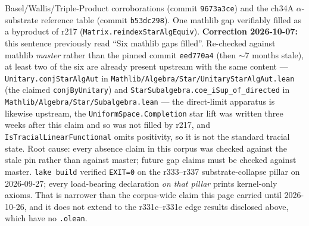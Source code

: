 \begin{titlepage}
{Basel/Wallis/Triple-Product corroborations (commit \texttt{9673a3ce}) and the ch34A $\alpha$-substrate reference table (commit \texttt{b53dc298}). One mathlib gap verifiably filled as a byproduct of r217 (\texttt{Matrix.reindexStarAlgEquiv}). \textbf{Correction 2026-10-07:} this sentence previously read ``Six mathlib gaps filled''. Re-checked against mathlib \emph{master} rather than the pinned commit \texttt{eed770a4} (then $\sim$7 months stale), at least two of the six are already present upstream with the same content --- \texttt{Unitary.conjStarAlgAut} in \texttt{Mathlib/Algebra/Star/UnitaryStarAlgAut.lean} (the claimed \texttt{conjByUnitary}) and \texttt{StarSubalgebra.coe\_iSup\_of\_directed} in \texttt{Mathlib/Algebra/Star/Subalgebra.lean} --- the direct-limit apparatus is likewise upstream, the \texttt{UniformSpace.Completion} star lift was written three weeks after this claim and so was not filled by r217, and \texttt{IsTracialLinearFunctional} omits positivity, so it is not the standard tracial state. Root cause: every absence claim in this corpus was checked against the stale pin rather than against master; future gap claims must be checked against master. \texttt{lake build} verified \texttt{EXIT=0} on the r333--r337 substrate-collapse pillar on 2026-09-27; every load-bearing declaration \emph{on that pillar} prints kernel-only axioms. That is narrower than the corpus-wide claim this page carried until 2026-10-26, and it does not extend to the r331c--r331e edge results disclosed above, which have no \texttt{.olean}.}

\end{titlepage}

